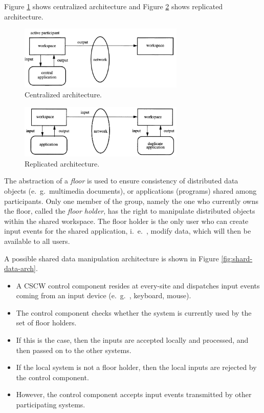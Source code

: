 Figure \ref{fig:centralized-arch} shows centralized architecture and Figure \ref{fig:replicated-arch} shows replicated architecture.
\begin{figure}[tph]
	\centering
	\includegraphics[width=0.7\textwidth]{graphics/centralized-arch}
	\caption{Centralized architecture.}
	\label{fig:centralized-arch}
\end{figure}

\begin{figure}[bph]
	\centering
	\includegraphics[width=0.7\textwidth]{graphics/replicated-arch}
	\caption{Replicated architecture.}
	\label{fig:replicated-arch}
\end{figure}


The abstraction of a \textit{floor} is used to ensure consistency of distributed data objects (e.\ g.\ multimedia documents), or applications (programs) shared among participants. Only one member of the group, namely the one who currently owns the floor, called the \textit{floor holder}, has the right to manipulate distributed objects within the shared workspace. The floor holder is the only user who can create input events for the shared application, i.\ e.\ , modify data, which will then be available to all users.

A possible shared data manipulation architecture is shown in Figure \ref{fig:shard-data-arch}. 
\begin{itemize}
	\item A CSCW control component resides at every-site and dispatches input events coming from an 	input device (e.\ g.\ , keyboard, mouse). 
	\item The control component checks whether the system is currently used by the set of floor holders. 
	\item If this is the case, then the inputs are accepted locally and processed, and then	passed on to the other systems.
	\item If the local system is not a floor holder, then the local	inputs are rejected by the control component.
	\item However, the control component accepts input events transmitted by other participating systems.
\end{itemize}


